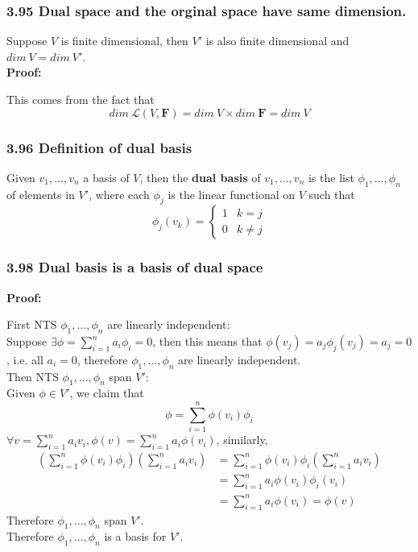 \documentclass{article}
\begin{document}
\subsubsection*{3.95 Dual space and the orginal space have same dimension.}
Suppose $V$ is finite dimensional, then $V'$ is also finite dimensional and $dim\ V = dim\ V'$.\\
\textbf{Proof:}
\begin{addmargin}[1em]{0em}
    This comes from the fact that
    \begin{equation*}
        dim\ \mathcal{L}(V, \mathbf{F}) = dim\ V \times dim\ \mathbf{F} = dim\ V \tag*{using 3.61}
    \end{equation*}
\end{addmargin}
\subsubsection*{3.96 Definition of dual basis}
Given $v_1, ..., v_n$ a basis of $V$, then the \textbf{dual basis} of $v_1, ..., v_n$ is the list $\phi_1, ..., \phi_n$ of elements in $V'$, where each $\phi_j$ is the linear functional on $V$ such that
\begin{equation*}
    \phi_j(v_k) = \begin{cases}
        1 & k = j\\
        0 & k \neq j
    \end{cases}
\end{equation*}
\subsubsection*{3.98 Dual basis is a basis of dual space}
\textbf{Proof:}
\begin{addmargin}[1em]{0em}
    First NTS $\phi_1, ..., \phi_n$ are linearly independent:\\
    Suppose $\exists \phi = \sum_{i=1}^{n} a_i\phi_i = 0$, then this means that $\phi(v_j) = a_j\phi_j(v_j) = a_j = 0$, i.e. all $a_i = 0$, therefore $\phi_1, ..., \phi_n$ are linearly independent.\\
    Then NTS $\phi_1, ..., \phi_n$ span $V'$:\\
    Given $\phi \in V'$, we claim that
    \begin{equation*}
        \phi = \sum_{i=1}^{n} \phi(v_i)\phi_i
    \end{equation*}
    $\forall v = \sum_{i=1}^{n}a_iv_i, \phi(v) = \sum_{i=1}^{n}a_i\phi(v_i)$, similarly,
    \begin{equation*}
        \begin{split}
            \left(\sum_{i=1}^{n} \phi(v_i)\phi_i\right)\left(\sum_{i=1}^{n} a_iv_i\right) &
            = \sum_{i=1}^{n} \phi(v_i)\phi_i\left(\sum_{i=1}^{n} a_iv_i\right)\\
            & = \sum_{i=1}^{n} a_i\phi(v_i)\phi_i(v_i) \\
            & = \sum_{i=1}^{n} a_i\phi(v_i) = \phi(v)
        \end{split}
    \end{equation*}
    Therefore $\phi_1, ..., \phi_n$ span $V'$.\\
    Therefore $\phi_1, ..., \phi_n$ is a basis for $V'$.
\end{addmargin}
\end{document}
